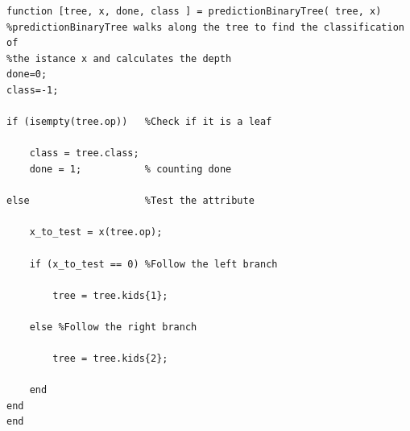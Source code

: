 \documentclass{article}
\begin{document}
\begin{lstlisting}[firstnumber=45]
function [tree, x, done, class ] = predictionBinaryTree( tree, x)
%predictionBinaryTree walks along the tree to find the classification of
%the istance x and calculates the depth
done=0;
class=-1;

if (isempty(tree.op))   %Check if it is a leaf
    
    class = tree.class;
    done = 1;           % counting done
    
else                    %Test the attribute
    
    x_to_test = x(tree.op);
    
    if (x_to_test == 0) %Follow the left branch
        
        tree = tree.kids{1};
        
    else %Follow the right branch
        
        tree = tree.kids{2};
        
    end   
end
end
\end{lstlisting}

\newpage
\end{document}
